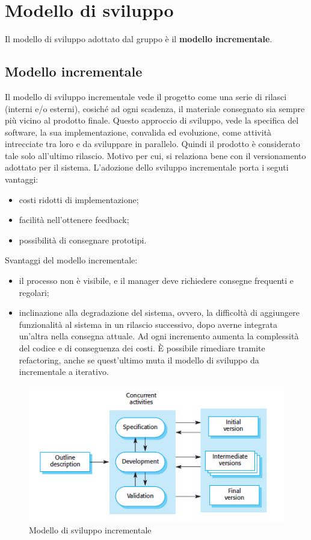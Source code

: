 \section{Modello di sviluppo}
Il modello di sviluppo adottato dal gruppo è il \textbf{modello incrementale}.
\subsection{Modello incrementale}
Il modello di sviluppo incrementale vede il progetto come una serie di rilasci (interni e/o esterni), cosiché ad ogni scadenza, il materiale consegnato sia sempre più vicino al prodotto finale.
Questo approccio di sviluppo, vede la specifica del software, la sua implementazione, convalida ed evoluzione, come attività intrecciate tra loro e da sviluppare in parallelo. Quindi il prodotto è considerato tale solo all'ultimo rilascio. Motivo per cui, si relaziona bene con il versionamento adottato per il sistema.
L'adozione dello sviluppo incrementale porta i seguti vantaggi:
\begin{itemize}
\item costi ridotti di implementazione;
\item facilità nell'ottenere feedback;
\item possibilità di consegnare prototipi.
\end{itemize}
Svantaggi del modello incrementale:
\begin{itemize}
\item il processo non è visibile, e il manager deve richiedere consegne frequenti e regolari;
\item inclinazione alla degradazione del sistema, ovvero, la difficoltà di aggiungere funzionalità al sistema in un rilascio successivo, dopo averne integrata un'altra nella consegna attuale. Ad ogni incremento aumenta la complessità del codice e di conseguenza dei costi. È possibile rimediare tramite refactoring, anche se quest'ultimo muta il modello di sviluppo da incrementale a iterativo.
\end{itemize}
\begin{figure}[H]
	\centering
	\includegraphics[width=0.70\linewidth]{img/incremental_development.png}
	\caption{Modello di sviluppo incrementale}
\end{figure}


